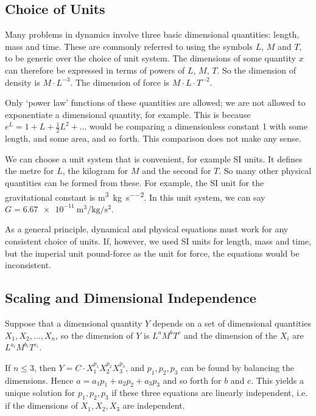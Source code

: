 \subsection{Choice of Units}
Many problems in dynamics involve three basic dimensional quantities: length, mass and time. These are commonly referred to using the symbols \(L\), \(M\) and \(T\), to be generic over the choice of unit system. The dimensions of some quantity \(x\) can therefore be expressed in terms of powers of \(L\), \(M\), \(T\). So the dimension of density is \(M \cdot L^{-3}\). The dimension of force is \(M \cdot L \cdot T^{-2}\).

Only `power law' functions of these quantities are allowed; we are not allowed to exponentiate a dimensional quantity, for example. This is because \(e^L = 1 + L + \frac{1}{2}L^2 + \dots\) would be comparing a dimensionless constant 1 with some length, and some area, and so forth. This comparison does not make any sense.

We can choose a unit system that is convenient, for example SI units. It defines the metre for \(L\), the kilogram for \(M\) and the second for \(T\). So many other physical quantities can be formed from these. For example, the SI unit for the gravitational constant is \si{\metre\cubed\per\kilogram\per\second\squared}. In this unit system, we can say \(G = \SI{6.67e-11}{\metre\cubed\per\kilogram\per\second\squared}\).

As a general principle, dynamical and physical equations must work for any consistent choice of units. If, however, we used SI units for length, mass and time, but the imperial unit pound-force as the unit for force, the equations would be inconsistent.

\subsection{Scaling and Dimensional Independence}
Suppose that a dimensional quantity \(Y\) depends on a set of dimensional quantities \(X_1, X_2, \dots, X_n\), so the dimension of \(Y\) is \(L^a M^b T^c\) and the dimension of the \(X_i\) are \(L^{a_i} M^{b_i} T^{c_i}\).

If \(n \leq 3\), then \(Y = C \cdot X_1^{p_1}X_2^{p_2}X_3^{p_3}\), and \(p_1, p_2, p_3\) can be found by balancing the dimensions. Hence \(a = a_1p_1 + a_2p_2 + a_3p_3\) and so forth for \(b\) and \(c\). This yields a unique solution for \(p_1, p_2, p_3\) if these three equations are linearly independent, i.e. if the dimensions of \(X_1, X_2, X_3\) are independent.

